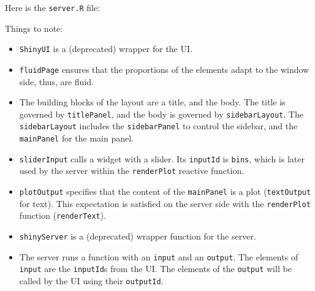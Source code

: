 \documentclass[]{book}
\newenvironment{Shaded}{\begin{snugshade}}{\end{snugshade}}
\newcommand{\KeywordTok}[1]{\textcolor[rgb]{0.13,0.29,0.53}{\textbf{{#1}}}}
\newcommand{\DataTypeTok}[1]{\textcolor[rgb]{0.13,0.29,0.53}{{#1}}}
\newcommand{\DecValTok}[1]{\textcolor[rgb]{0.00,0.00,0.81}{{#1}}}
\newcommand{\StringTok}[1]{\textcolor[rgb]{0.31,0.60,0.02}{{#1}}}
\newcommand{\CommentTok}[1]{\textcolor[rgb]{0.56,0.35,0.01}{\textit{{#1}}}}
\newcommand{\NormalTok}[1]{{#1}}
\providecommand{\tightlist}{%
  \setlength{\itemsep}{0pt}\setlength{\parskip}{0pt}}
\theoremstyle{definition}
\theoremstyle{definition}
\theoremstyle{remark}
\begin{document}
Here is the \texttt{server.R} file:

\begin{Shaded}
\end{Shaded}

Things to note:

\begin{itemize}
\tightlist
\item
  \texttt{ShinyUI} is a (deprecated) wrapper for the UI.
\item
  \texttt{fluidPage} ensures that the proportions of the elements adapt
  to the window side, thus, are fluid.
\item
  The building blocks of the layout are a title, and the body. The title
  is governed by \texttt{titlePanel}, and the body is governed by
  \texttt{sidebarLayout}. The \texttt{sidebarLayout} includes the
  \texttt{sidebarPanel} to control the sidebar, and the
  \texttt{mainPanel} for the main panel.
\item
  \texttt{sliderInput} calls a widget with a slider. Its
  \texttt{inputId} is \texttt{bins}, which is later used by the server
  within the \texttt{renderPlot} reactive function.
\item
  \texttt{plotOutput} specifies that the content of the
  \texttt{mainPanel} is a plot (\texttt{textOutput} for text). This
  expectation is satisfied on the server side with the
  \texttt{renderPlot} function (\texttt{renderText}).
\item
  \texttt{shinyServer} is a (deprecated) wrapper function for the
  server.
\item
  The server runs a function with an \texttt{input} and an
  \texttt{output}. The elements of \texttt{input} are the
  \texttt{inputId}s from the UI. The elements of the \texttt{output}
  will be called by the UI using their \texttt{outputId}.
\end{itemize}
\end{document}

